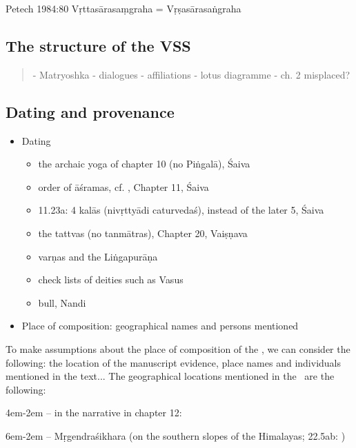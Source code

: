 \documentclass[11pt]{book}
\begin{document}
Petech 1984:80 Vṛttasārasaṃgraha = Vṛṣasārasaṅgraha

\subsection{The structure of the VSS}

\begin{quote}
- Matryoshka 
- dialogues
- affiliations
- lotus diagramme
- ch. 2 misplaced? 
\end{quote}

\vfill
\pagebreak




\subsection{Dating and provenance}

\begin{itemize}

\item
  Dating

  \begin{itemize}
  
  \item
    the archaic yoga of chapter 10 (no Piṅgalā), Śaiva
  \item
    order of āśramas, cf. , Chapter 11, Śaiva
  \item
    11.23a: 4 kalās (nivṛttyādi caturvedaś), instead of the later 5,
    Śaiva
  \item
    the tattvas (no tanmātras), Chapter 20, Vaiṣṇava
  \item
    varṇas and the Liṅgapurāṇa
  \item
    check lists of deities such as Vasus
  \item
bull, Nandi
  \end{itemize}
\item
  Place of composition: geographical names and persons mentioned
\end{itemize}

To make assumptions about the place of composition of the \Vss,
we can consider the following: the location of the manuscript 
evidence, place names and individuals mentioned in the text... 
The geographical locations 
mentioned in the \Vss\ are the following:

\leftskip4em\parindent-2em
-- in the narrative in chapter 12:

\leftskip6em\parindent-2em
-- Mṛgendraśikhara (on the southern slopes of
					the Himalayas; 22.5ab: 
		 			)
		 			
\end{document}
